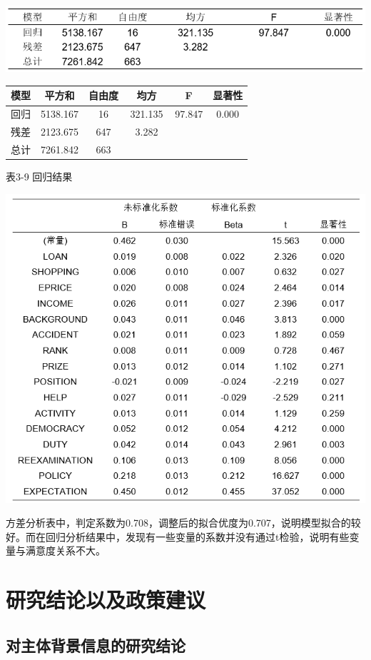 \documentclass[UTF8,a4paper,12pt]{ctexart}  %
\begin{document}
\includegraphics{id3_8.png}　

\begin{longtable}[]{@{}cccccc@{}}
\toprule
模型 & 平方和 & 自由度 & 均方 & F & 显著性\tabularnewline
\midrule
\endhead
回归 & 5138.167 & 16 & 321.135 & 97.847 & 0.000\tabularnewline
残差 & 2123.675 & 647 & 3.282 & &\tabularnewline
总计 & 7261.842 & 663 & 　 　 　 & &\tabularnewline
\bottomrule
\end{longtable}

表3-9 回归结果

\includegraphics{id3_9.png}

方差分析表中，判定系数为0.708，调整后的拟合优度为0.707，说明模型拟合的较好。而在回归分析结果中，发现有一些变量的系数并没有通过t检验，说明有些变量与满意度关系不大。

\hypertarget{section-31}{%
\section{研究结论以及政策建议}\label{section-31}}

\hypertarget{section-32}{%
\subsection{对主体背景信息的研究结论}\label{section-32}}
\end{document}
